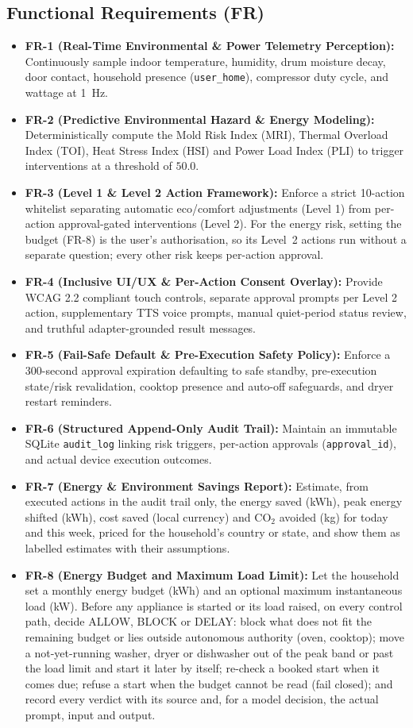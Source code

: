\documentclass[conference]{IEEEtran}
\begin{document}
\subsection{Functional Requirements (FR)}
\begin{itemize}
    \item \textbf{FR-1 (Real-Time Environmental \& Power Telemetry Perception):} Continuously sample indoor temperature, humidity, drum moisture decay, door contact, household presence (\texttt{user\_home}), compressor duty cycle, and wattage at 1~Hz.
    \item \textbf{FR-2 (Predictive Environmental Hazard \& Energy Modeling):} Deterministically compute the Mold Risk Index (MRI), Thermal Overload Index (TOI), Heat Stress Index (HSI) and Power Load Index (PLI) to trigger interventions at a threshold of $50.0$.
    \item \textbf{FR-3 (Level 1 \& Level 2 Action Framework):} Enforce a strict 10-action whitelist separating automatic eco/comfort adjustments (Level 1) from per-action approval-gated interventions (Level 2). For the energy risk, setting the budget (FR-8) is the user's authorisation, so its Level~2 actions run without a separate question; every other risk keeps per-action approval.
    \item \textbf{FR-4 (Inclusive UI/UX \& Per-Action Consent Overlay):} Provide WCAG 2.2 compliant touch controls, separate approval prompts per Level 2 action, supplementary TTS voice prompts, manual quiet-period status review, and truthful adapter-grounded result messages.
    \item \textbf{FR-5 (Fail-Safe Default \& Pre-Execution Safety Policy):} Enforce a 300-second approval expiration defaulting to safe standby, pre-execution state/risk revalidation, cooktop presence and auto-off safeguards, and dryer restart reminders.
    \item \textbf{FR-6 (Structured Append-Only Audit Trail):} Maintain an immutable SQLite \texttt{audit\_log} linking risk triggers, per-action approvals (\texttt{approval\_id}), and actual device execution outcomes.
    \item \textbf{FR-7 (Energy \& Environment Savings Report):} Estimate, from executed actions in the audit trail only, the energy saved (kWh), peak energy shifted (kWh), cost saved (local currency) and CO$_2$ avoided (kg) for today and this week, priced for the household's country or state, and show them as labelled estimates with their assumptions.
    \item \textbf{FR-8 (Energy Budget and Maximum Load Limit):} Let the household set a monthly energy budget (kWh) and an optional maximum instantaneous load (kW). Before any appliance is started or its load raised, on every control path, decide ALLOW, BLOCK or DELAY: block what does not fit the remaining budget or lies outside autonomous authority (oven, cooktop); move a not-yet-running washer, dryer or dishwasher out of the peak band or past the load limit and start it later by itself; re-check a booked start when it comes due; refuse a start when the budget cannot be read (fail closed); and record every verdict with its source and, for a model decision, the actual prompt, input and output.
\end{itemize}
\end{document}
